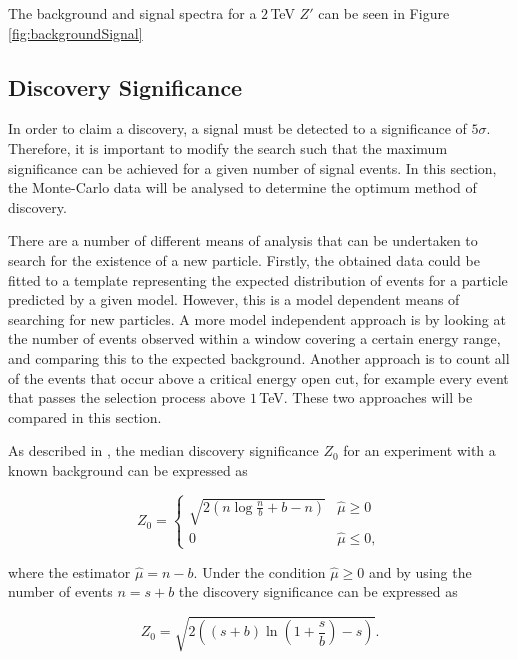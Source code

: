 \documentclass{article}
\begin{document}
The background and signal spectra for a $2\,$TeV $Z'$ can be seen in Figure \ref{fig:backgroundSignal}

\subsection{Discovery Significance}
\label{sec:MCA_Discovery}

In order to claim a discovery, a signal must be detected to a significance of $5\sigma$. Therefore, it is important to modify the search such that the maximum significance can be achieved for a given number of signal events. In this section, the Monte-Carlo data will be analysed to determine the optimum method of discovery.

There are a number of different means of analysis that can be undertaken to search for the existence of a new particle. Firstly, the obtained data could be fitted to a template representing the expected distribution of events for a particle predicted by a given model. However, this is a model dependent means of searching for new particles. A more model independent approach is by looking at the number of events observed within a window covering a certain energy range, and comparing this to the expected background. Another approach is to count all of the events that occur above a critical energy open cut, for example every event that passes the selection process above $1\,$TeV. These two approaches will be compared in this section.

As described in \cite{Cowan:2010js}, the median discovery significance $Z_0$ for an experiment with a known background can be expressed as

\begin{equation}
Z_0 = \begin{cases}
    \sqrt{2\left(n\log\frac{n}{b}+b-n \right)} & \widehat{\mu}\geq0\\        0         & \widehat{\mu}\leq0,
\end{cases}
\end{equation}

where the estimator $\widehat{\mu}=n-b$. Under the condition $\widehat{\mu}\geq0$ and by using the number of events $n=s+b$ the discovery significance can be expressed as 

\begin{equation}
Z_0 = \sqrt{2\left(  (s+b)\ln\left(1+\frac{s}{b}\right)  - s \right)}.
\label{eqn:asimov}
\end{equation}
\end{document}

